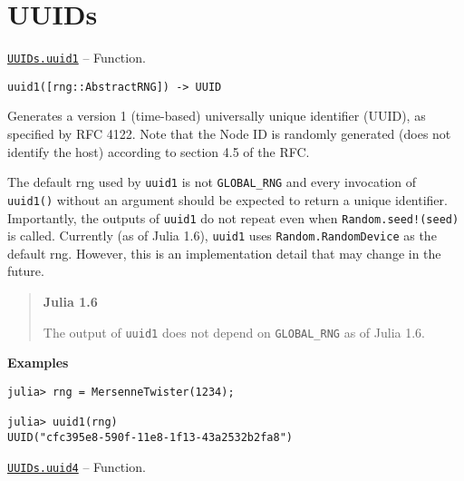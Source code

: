 \hypertarget{2767829618755343548}{}


\chapter{UUIDs}


\hypertarget{16892127995397163681}{}
\hyperlink{16892127995397163681}{\texttt{UUIDs.uuid1}}  -- {Function.}

\begin{adjustwidth}{2em}{0pt}


\begin{verbatim}
uuid1([rng::AbstractRNG]) -> UUID
\end{verbatim}

Generates a version 1 (time-based) universally unique identifier (UUID), as specified by RFC 4122. Note that the Node ID is randomly generated (does not identify the host) according to section 4.5 of the RFC.

The default rng used by \texttt{uuid1} is not \texttt{GLOBAL\_RNG} and every invocation of \texttt{uuid1()} without an argument should be expected to return a unique identifier. Importantly, the outputs of \texttt{uuid1} do not repeat even when \texttt{Random.seed!(seed)} is called. Currently (as of Julia 1.6), \texttt{uuid1} uses \texttt{Random.RandomDevice} as the default rng. However, this is an implementation detail that may change in the future.

\begin{quote}
\textbf{Julia 1.6}

The output of \texttt{uuid1} does not depend on \texttt{GLOBAL\_RNG} as of Julia 1.6.

\end{quote}
\textbf{Examples}


\begin{verbatim}
julia> rng = MersenneTwister(1234);

julia> uuid1(rng)
UUID("cfc395e8-590f-11e8-1f13-43a2532b2fa8")
\end{verbatim}



\end{adjustwidth}
\hypertarget{15125074142528432744}{}
\hyperlink{15125074142528432744}{\texttt{UUIDs.uuid4}}  -- {Function.}

